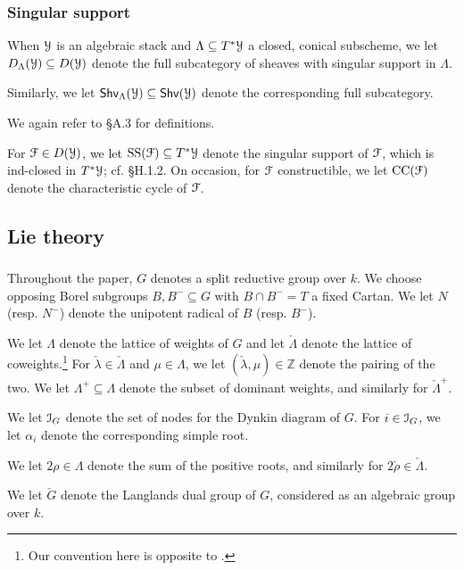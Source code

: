 \documentclass[reqno,11pt]{amsart}
\numberwithin{equation}{subsection}
\theoremstyle{remark}
\newcommand{\bZ}{{\mathbb Z}}
\newcommand{\sF}{{\EuScript F}}
\newcommand{\sI}{{\EuScript I}}
\newcommand{\sY}{{\EuScript Y}}
\newcommand{\on}{\operatorname}
\renewcommand{\subset}{\subseteq}
\newcommand{\Shv}{\mathsf{Shv}}
\renewcommand{\SS}{\on{SS}}
\newcommand{\CC}{\on{CC}}
\begin{document}
\subsubsection{Singular support}

When $\sY$ is an algebraic stack and 
$\Lambda \subset T^*\sY$ a closed, conical 
subscheme, we let
$D_{\Lambda}(\sY) \subset D(\sY)$ denote the full subcategory of
sheaves with singular support in $\Lambda$. 

Similarly, we let $\Shv_{\Lambda}(\sY) \subset \Shv(\sY)$
denote the corresponding full subcategory. 

We again refer to \cite{toy-model} \S A.3 for definitions.

For $\sF \in D(\sY)$, we let $\SS(\sF) \subset T^*\sY$ denote
the singular support of $\sF$, which is ind-closed in $T^*\sY$;
cf. \cite{agkrrv1} \S H.1.2. On occasion, for $\sF$ constructible,
we let $\CC(\sF)$ denote the characteristic cycle of $\sF$.

\subsection{Lie theory}

\subsubsection{} Throughout the paper, $G$ denotes a split reductive group
over $k$. We choose opposing Borel subgroups $B,B^- \subset G$ with
$B \cap B^- = T$ a fixed Cartan. We let $N$ (resp. $N^-$) denote the
unipotent radical of $B$ (resp. $B^-$).

We let $\Lambda$ denote the lattice of weights of $G$ and let
$\check{\Lambda}$ denote the lattice of coweights.\footnote{Our convention
here is opposite to \cite{agkrrv1}.} 
For $\check{\lambda} \in \check{\Lambda}$ and $\mu \in \Lambda$, we
let $(\check{\lambda},\mu) \in \bZ$ denote the pairing of the two.
We let $\Lambda^+ \subset \Lambda$ denote the subset of
dominant weights, and similarly for $\check{\Lambda}^+$.

We let $\sI_G$ denote the set of nodes for the Dynkin diagram of $G$.
For $i \in \sI_G$, we let $\alpha_i$ denote the corresponding
simple root.

We let $2\rho \in \Lambda$ denote the sum of the positive roots,
and similarly for $2\check{\rho} \in \check{\Lambda}$.

We let $\check{G}$ denote the Langlands dual group of $G$, considered
as an algebraic group over $k$.
\end{document}
